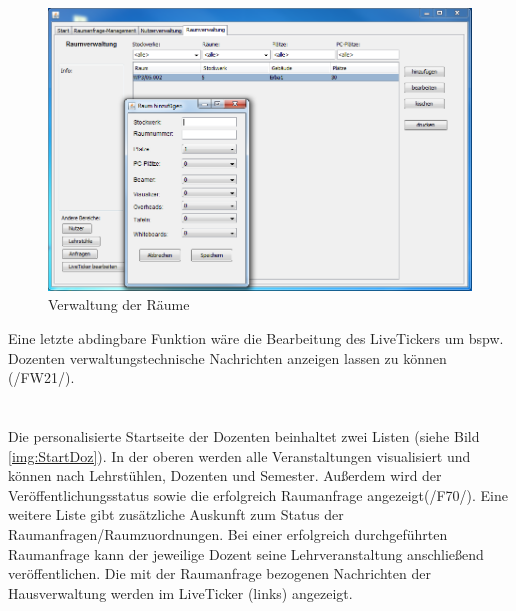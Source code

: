 \begin{figure}[H]
\begin{center}
\includegraphics[width=150mm]{images/section_7/VerwaltungRaumverwaltung.PNG}
\caption{Verwaltung der Räume}
\label{img:RaumVerw}
\end{center}
\end{figure}
Eine letzte abdingbare Funktion wäre die Bearbeitung des LiveTickers um bspw. Dozenten verwaltungstechnische Nachrichten anzeigen lassen zu können (/FW21/).\\ \\ \\

Die personalisierte Startseite der Dozenten beinhaltet zwei Listen (siehe Bild \ref{img:StartDoz}). In der oberen werden alle Veranstaltungen visualisiert und können nach Lehrstühlen, Dozenten und Semester. Außerdem wird der Veröffentlichungsstatus sowie die erfolgreich Raumanfrage angezeigt(/F70/). Eine weitere Liste gibt zusätzliche Auskunft zum Status der Raumanfragen/Raumzuordnungen. Bei einer erfolgreich durchgeführten Raumanfrage kann der jeweilige Dozent seine Lehrveranstaltung anschließend veröffentlichen. Die mit der Raumanfrage bezogenen Nachrichten der Hausverwaltung werden im LiveTicker (links) angezeigt.

